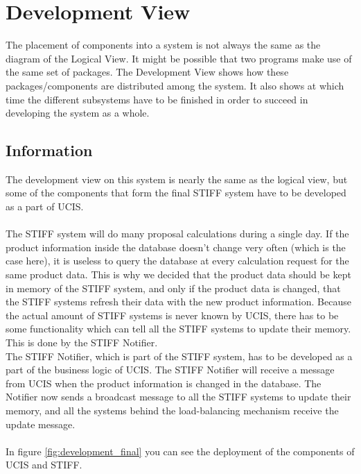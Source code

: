 \chapter{Development View}
The placement of components into a system is not always the same as the diagram of the
Logical View. It might be possible that two programs make use of the same set of packages. 
The Development View shows how these packages/components are distributed among the system.
It also shows at which time the different subsystems have to be finished in order to
succeed in developing the system as a whole.


\section{Information}
The development view on this system is nearly the same as the logical view,
but some of the components that form the final STIFF system have to be developed
as a part of UCIS.\\
 \\
The STIFF system will do many proposal calculations during a single day. If the product
information inside the database doesn't change very often (which is the case here), it
is useless to query the database at every calculation request for the same product data.
This is why we decided that the product data should be kept in memory of the STIFF system,
and only if the product data is changed, that the STIFF systems refresh their data with
the new product information. Because the actual amount of STIFF systems is never known
by UCIS, there has to be some functionality which can tell all the STIFF systems to update
their memory. This is done by the STIFF Notifier.\\
The STIFF Notifier, which is part of the STIFF system, has to be developed
as a part of the business logic of UCIS. The STIFF Notifier will receive a message from UCIS
when the product information is changed in the database. The Notifier now sends a broadcast 
message to all the STIFF systems to update their memory, and all the systems behind the
load-balancing mechanism receive the update message.\\
 \\
In figure \ref{fig:development_final} you can see the deployment of the components of 
UCIS and STIFF.

